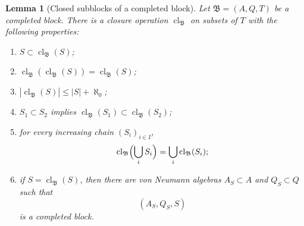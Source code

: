 \documentclass[11pt,letterpaper,reqno]{amsart}
\newtheorem{lem}[thm]{Lemma}
\theoremstyle{definition}
\numberwithin{equation}{section}
\newcommand{\cl}{\operatorname{cl}}
\begin{document}
\begin{lem}[Closed subblocks of a completed block]\label{lem:closed-subblock}
Let $\mathfrak B=(A,Q,T)$ be a completed block.  There is a closure operation $\cl_{\mathfrak B}$ on subsets of $T$ with the following properties:
\begin{enumerate}[label=(\roman*)]
\item $S\subset\cl_{\mathfrak B}(S)$;
\item $\cl_{\mathfrak B}(\cl_{\mathfrak B}(S))=\cl_{\mathfrak B}(S)$;
\item $|\cl_{\mathfrak B}(S)|\leq |S|+\aleph_0$;
\item $S_1\subset S_2$ implies $\cl_{\mathfrak B}(S_1)\subset\cl_{\mathfrak B}(S_2)$;
\item for every increasing chain $(S_i)_{i\in I}$,
\[
   \cl_{\mathfrak B}\Bigl(\bigcup_iS_i\Bigr)=\bigcup_i\cl_{\mathfrak B}(S_i);
\]
\item if $S=\cl_{\mathfrak B}(S)$, then there are von Neumann algebras $A_S\subset A$ and $Q_S\subset Q$ such that
\[
   (A_S,Q_S,S)
\]
is a completed block.
\end{enumerate}
\end{lem}
\end{document}

